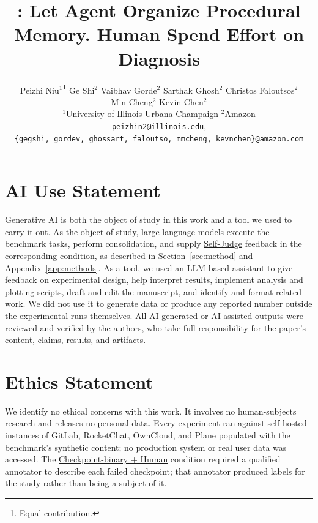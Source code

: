 \documentclass{article}
\title{\method: Let Agent Organize Procedural Memory. Human Spend Effort on Diagnosis}
\author{%
Peizhi Niu$^{1}$\thanks{Equal contribution.} \quad
Ge Shi$^{2}$\footnotemark[1] \quad
Vaibhav Gorde$^{2}$ \quad
Sarthak Ghosh$^{2}$ \quad
Christos Faloutsos$^{2}$ \\
Min Cheng$^{2}$ \quad
Kevin Chen$^{2}$ \\[4pt]
$^{1}$University of Illinois Urbana-Champaign \quad $^{2}$Amazon \\
\texttt{peizhin2@illinois.edu}, \\
\texttt{\{gegshi, gordev, ghossart, faloutso, mmcheng, kevnchen\}@amazon.com}
}
\newcommand{\cond}[1]{\uline{#1}}
\begin{document}
\maketitle
{} %










\newpage


\section*{AI Use Statement}
Generative AI is both the object of study in this work and a tool we used to
carry it out. As the object of study, large language models execute the
benchmark tasks, perform consolidation, and supply \cond{Self-Judge} feedback
in the corresponding condition, as described in Section~\ref{sec:method} and
Appendix~\ref{app:methods}. As a tool, we used an LLM-based assistant to give
feedback on experimental design, help interpret results, implement analysis and
plotting scripts, draft and edit the manuscript, and identify and format
related work. We did not use it to generate data or produce any reported number
outside the experimental runs themselves. All AI-generated or AI-assisted
outputs were reviewed and verified by the authors, who take full responsibility
for the paper's content, claims, results, and artifacts.

\section*{Ethics Statement}
We identify no ethical concerns with this work. It involves no human-subjects
research and releases no personal data. Every experiment ran against
self-hosted instances of GitLab, RocketChat, OwnCloud, and Plane populated
with the benchmark's synthetic content; no production system or real user data
was accessed. The \cond{Checkpoint-binary + Human} condition required a
qualified annotator to describe each failed checkpoint; that annotator produced
labels for the study rather than being a subject of it.
\end{document}
